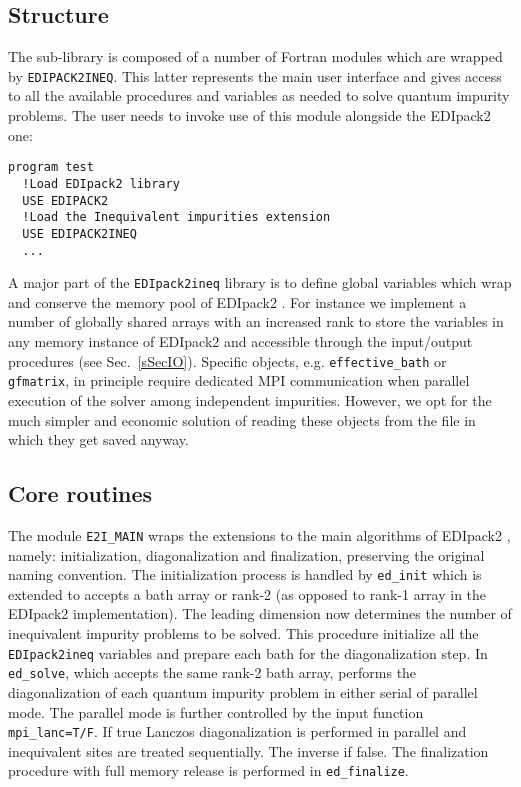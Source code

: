 \documentclass[preprint,3p,10pt]{elsarticle}
\newcommand{\secu}[1]
{Sec.~\ref{#1}}
\def\NAME{{\rm EDIpack2 }}
\begin{document}
\subsection{Structure}\label{sSecIneqStructure}
The sub-library is composed of a number of Fortran modules which are
wrapped by {\tt EDIPACK2INEQ}. This latter represents the main user
interface and gives access to all the available procedures and
variables as needed to solve quantum impurity problems.
The user needs to invoke use of this module alongside the \NAME one:
\begin{lstlisting}[style=fstyle,numbers=none,basicstyle={\scriptsize\ttfamily}]
program test
  !Load EDIpack2 library 
  USE EDIPACK2 
  !Load the Inequivalent impurities extension
  USE EDIPACK2INEQ
  ...
\end{lstlisting}


A major part of the {\tt EDIpack2ineq} library is to define global
variables which wrap and conserve the memory pool of \NAME.
For instance we implement a number of
globally shared arrays with an increased rank to store the
variables in any memory instance of \NAME and accessible through
the input/output procedures (see \secu{sSecIO}).
Specific objects, e.g. {\tt effective\_bath} or {\tt gfmatrix}, in
principle require dedicated MPI
communication when parallel execution of the solver among independent
impurities. However, we opt for the much simpler and economic solution
of reading these objects from the file in which they get saved
anyway. 


\subsection{Core routines}\label{sSecIneqGlobal}
The module {\tt E2I\_MAIN} wraps the extensions to the main algorithms
of \NAME, namely: initialization, diagonalization and finalization,
preserving the original naming convention.  
The initialization process is handled by {\tt ed\_init} which is
extended to accepts a bath array or rank-2 (as opposed to rank-1 array
in the \NAME implementation). The leading dimension now determines the
number of inequivalent impurity problems to be solved. This procedure
initialize all the {\tt EDIpack2ineq} variables and prepare each bath
for the diagonalization step. 
In {\tt ed\_solve}, which accepts the same rank-2 bath array, performs the
diagonalization of each quantum impurity problem in either serial of
parallel mode. The parallel mode is further controlled by the input
function {\tt mpi\_lanc=T/F}. If true Lanczos diagonalization is
performed in parallel and inequivalent sites are treated
sequentially. The inverse if false.   
The finalization procedure with full memory release is performed in
{\tt ed\_finalize}.
\end{document}
